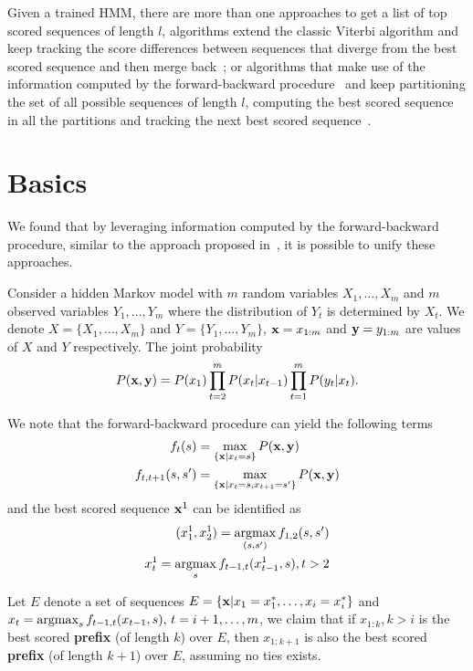 Given a trained HMM, there are more than one approaches to get a list of top scored sequences of length $l$, 
\eg algorithms extend the classic Viterbi algorithm and keep tracking the score differences between sequences 
that diverge from the best scored sequence and then merge back~\cite{seshadri1994list,nill1995list};
or algorithms that make use of the information computed by the forward-backward procedure~\cite{rabiner1989tutorial}
and keep partitioning the set of all possible sequences of length $l$, computing the best scored sequence in all the partitions
and tracking the next best scored sequence~\cite{nilsson2001sequentially}.

\section{Basics}
\label{sec:basic}

We found that by leveraging information computed by the forward-backward procedure, similar to the approach proposed in~\cite{nilsson2001sequentially},
it is possible to unify these approaches.

Consider a hidden Markov model with $m$ random variables $X_1, \dots, X_m$ and $m$ observed variables $Y_1, \dots, Y_m$
where the distribution of $Y_t$ is determined by $X_t$.
We denote $X = \{X_1, \dots, X_m\}$ and $Y = \{Y_1, \dots, Y_m\}$, 
$\mathbf{x} = x_{1:m}$ and $\mathbf{y} = y_{1:m}$ are values of $X$ and $Y$ respectively.
The joint probability 
\begin{equation}
\label{eq:joint}
P(\mathbf{x}, \mathbf{y}) = P(x_1) \prod_{t=2}^m P(x_t |x_{t-1}) \prod_{t=1}^m P(y_t |x_t).
\end{equation}

We note that the forward-backward procedure can yield the following terms 
\begin{align}
\label{eq:basic}
f_t(s)           &= \max_{\{\mathbf{x}|x_t = s\}} P(\mathbf{x}, \mathbf{y}) \\
f_{t,t+1}(s, s') &= \max_{\{\mathbf{x}|x_t = s, x_{t+1} = s'\}} P(\mathbf{x}, \mathbf{y})
\end{align}
and the best scored sequence $\mathbf{x}^1$ can be identified as
\begin{align*}
(x_1^1, x_2^1) = \operatorname*{argmax}_{(s, s')} f_{1,2}(s, s') \\
x_t^1 = \operatorname*{argmax}_{s} f_{t-1, t}(x_{t-1}^1, s), t > 2
\end{align*}

\begin{lemma}
\label{lemma1}
Let $E$ denote a set of sequences $E = \{\mathbf{x} |x_1 = x_1^*, \dots, x_i = x_i^*\}$ and
$x_t = \operatorname*{argmax}_{s} f_{t-1, t}(x_{t-1}, s), \, t = i+1,\dots,m$, 
we claim that if $x_{1:k}, k > i$ is the best scored \textbf{prefix} (of length $k$) over $E$, 
then $x_{1:k+1}$ is also the best scored \textbf{prefix} (of length $k+1$) over $E$,
assuming no ties exists.
\end{lemma}

